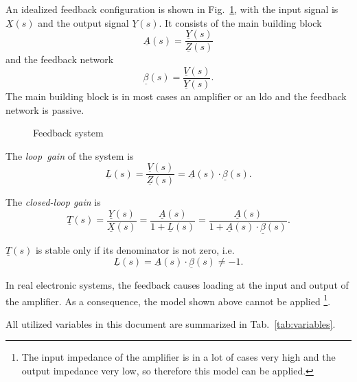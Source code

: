 \documentclass{article}[11pt]
\begin{document}
\notetitle

An idealized feedback configuration is shown in Fig.~\ref{fig:fs},
with the input signal is $\underline{X}(s)$ and the output signal
$\underline{Y}(s)$.
It consists of the main building block
\begin{equation}
\underline{A}(s) = \frac{\underline{Y}(s)}{\underline{Z}(s)}
\end{equation}
and the feedback network
\begin{equation}
\underline{\beta}(s) = \frac{\underline{V}(s)}{\underline{Y}(s)}.
\end{equation}
The main building block is in most cases an amplifier or an \gls{ldo} 
and the feedback network is passive.
\begin{figure}[H]
  \centering
  \begin{tikzpicture}
    
  \end{tikzpicture}
  \caption{Feedback system}
  \label{fig:fs}
\end{figure}

The \textit{loop~gain} of the system is 
\begin{equation}
\underline{L}(s) = \frac{\underline{V}(s)}{\underline{Z}(s)} 
                 = \underline{A}(s) \cdot \underline{\beta}(s).
\end{equation}

The \textit{closed-loop gain} is
\begin{equation}\label{eq:fs}
\underline{T}(s) = \frac{\underline{Y}(s)}{\underline{X}(s)} 
                 = \frac{\underline{A}(s)}{1+\underline{L}(s)}
                 = \frac{\underline{A}(s)}{1+\underline{A}(s) \cdot \underline{\beta}(s)}.
\end{equation}

$\underline{T}(s)$ is stable only if its denominator is not zero, i.e. 
\begin{equation}
\underline{L}(s) = \underline{A}(s) \cdot \underline{\beta}(s) \neq -1.
\end{equation}

In real electronic systems, the feedback causes loading at the input and output 
of the amplifier.
As a consequence, the model shown above cannot be applied%
\footnote{The input impedance of the amplifier is in a lot of cases very high
and the output impedance very low, so therefore this model can be applied.}.

\medskip

All utilized variables in this document are summarized in 
Tab.~\ref{tab:variables}.
\end{document}
